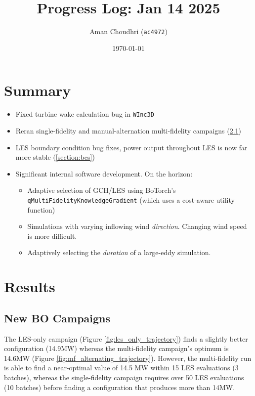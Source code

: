 \documentclass[11pt]{article}
\title{Progress Log: Jan 14 2025}
\author{Aman Choudhri (\texttt{ac4972})}
\date{\today}
\begin{document}
\maketitle

\section{Summary}

\begin{itemize}
    \item Fixed turbine wake calculation bug in \texttt{WInc3D}
    \item Reran single-fidelity and manual-alternation multi-fidelity campaigns (\ref{section:campaigns})
    \item LES boundary condition bug fixes, power output throughout LES is now far more stable (\ref{section:bcs})
    \item Significant internal software development. On the horizon:
        \begin{itemize}
            \item Adaptive selection of GCH/LES using BoTorch's \texttt{qMultiFidelityKnowledgeGradient}
                (which uses a cost-aware utility function)
            \item Simulations with varying inflowing wind \emph{direction}. Changing wind speed is more difficult.
            \item Adaptively selecting the \emph{duration} of a large-eddy simulation.
        \end{itemize}
\end{itemize}


\section{Results}

\subsection{New BO Campaigns}
\label{section:campaigns}
The LES-only campaign (Figure \ref{fig:les_only_trajectory}) finds a slightly
better configuration (14.9MW) whereas the multi-fidelity campaign's optimum is
14.6MW (Figure \ref{fig:mf_alternating_trajectory}). However, the
multi-fidelity run is able to find a near-optimal value of 14.5 MW within 15
LES evaluations (3 batches), whereas the single-fidelity campaign requires over 50 LES
evaluations (10 batches) before finding a configuration that produces more than 14MW.
\end{document}
